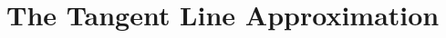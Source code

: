 \section{The Tangent Line Approximation} \label{S:1.8.TanLineApprox}



\newpage



\newpage



\newpage
